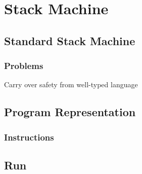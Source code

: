\section{Stack Machine}
\label{sec:stack-machine}
\subsection{Standard Stack Machine}
\subsubsection{Problems}
Carry over safety from well-typed language
\subsection{Program Representation}
\subsubsection{Instructions}

\subsection{Run}